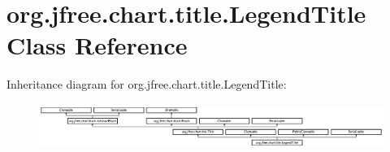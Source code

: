 \hypertarget{classorg_1_1jfree_1_1chart_1_1title_1_1_legend_title}{}\section{org.\+jfree.\+chart.\+title.\+Legend\+Title Class Reference}
\label{classorg_1_1jfree_1_1chart_1_1title_1_1_legend_title}
Inheritance diagram for org.\+jfree.\+chart.\+title.\+Legend\+Title\+:\begin{figure}[H]
\begin{center}
\leavevmode
\includegraphics[height=1.467890cm]{classorg_1_1jfree_1_1chart_1_1title_1_1_legend_title}
\end{center}
\end{figure}
